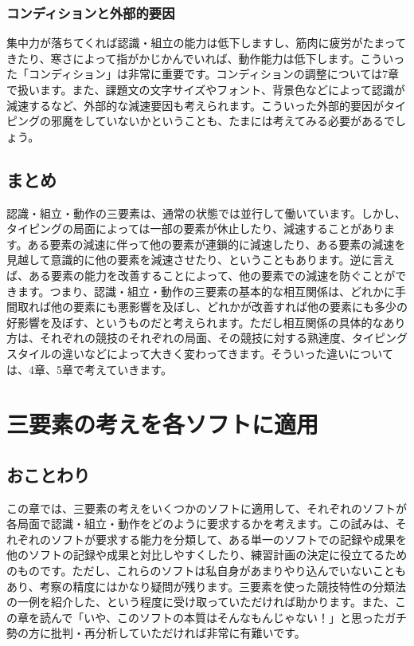 \subsubsection*{コンディションと外部的要因}

集中力が落ちてくれば認識・組立の能力は低下しますし、筋肉に疲労がたまってきたり、寒さによって指がかじかんでいれば、動作能力は低下します。こういった「コンディション」は非常に重要です。コンディションの調整については7章で扱います。また、課題文の文字サイズやフォント、背景色などによって認識が減速するなど、外部的な減速要因も考えられます。こういった外部的要因がタイピングの邪魔をしていないかということも、たまには考えてみる必要があるでしょう。

\subsection{まとめ}

認識・組立・動作の三要素は、通常の状態では並行して働いています。しかし、タイピングの局面によっては一部の要素が休止したり、減速することがあります。ある要素の減速に伴って他の要素が連鎖的に減速したり、ある要素の減速を見越して意識的に他の要素を減速させたり、ということもあります。逆に言えば、ある要素の能力を改善することによって、他の要素での減速を防ぐことができます。つまり、認識・組立・動作の三要素の基本的な相互関係は、どれかに手間取れば他の要素にも悪影響を及ぼし、どれかが改善すれば他の要素にも多少の好影響を及ぼす、というものだと考えられます。ただし相互関係の具体的なあり方は、それぞれの競技のそれぞれの局面、その競技に対する熟達度、タイピングスタイルの違いなどによって大きく変わってきます。そういった違いについては、4章、5章で考えていきます。

\section{三要素の考えを各ソフトに適用}

\subsection{おことわり}

この章では、三要素の考えをいくつかのソフトに適用して、それぞれのソフトが各局面で認識・組立・動作をどのように要求するかを考えます。この試みは、それぞれのソフトが要求する能力を分類して、ある単一のソフトでの記録や成果を他のソフトの記録や成果と対比しやすくしたり、練習計画の決定に役立てるためのものです。ただし、これらのソフトは私自身があまりやり込んでいないこともあり、考察の精度にはかなり疑問が残ります。三要素を使った競技特性の分類法の一例を紹介した、という程度に受け取っていただければ助かります。また、この章を読んで「いや、このソフトの本質はそんなもんじゃない！」と思ったガチ勢の方に批判・再分析していただければ非常に有難いです。

